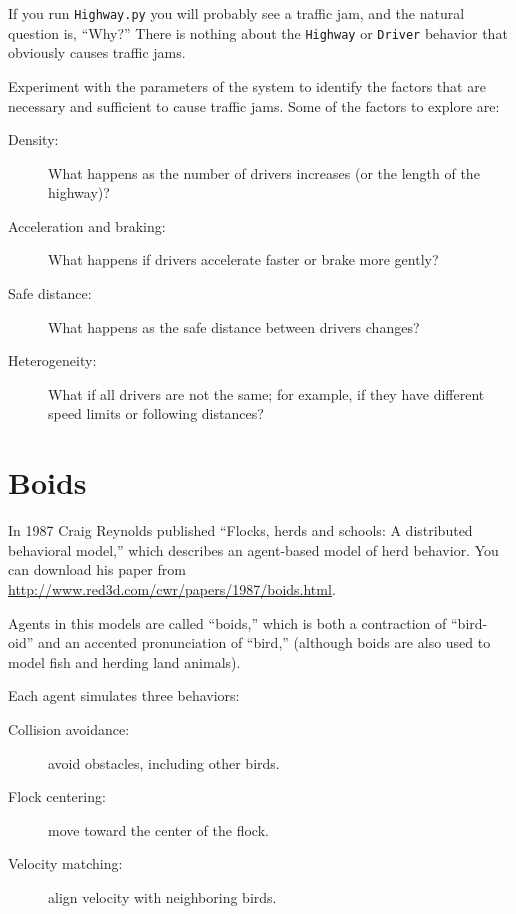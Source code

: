\documentclass[10pt]{book}
\begin{document}
If you run {\tt Highway.py} you will probably see a traffic jam,
and the natural question is, ``Why?''  There is nothing about the
{\tt Highway} or {\tt Driver} behavior that obviously causes
traffic jams.

\begin{exercise}

Experiment with the parameters of the system to identify the factors
that are necessary and sufficient to cause traffic jams.  Some of
the factors to explore are:

\begin{description}

\item[Density:] What happens as the number of drivers increases (or
the length of the highway)?

\item[Acceleration and braking:]  What happens if drivers accelerate
faster or brake more gently?

\item[Safe distance:] What happens as the safe distance between drivers
changes?

\item[Heterogeneity:] What if all drivers are not the same; for
example, if they have different speed limits or following distances?

\end{description}

\end{exercise}


\section{Boids}

In 1987 Craig Reynolds published ``Flocks, herds and
schools: A distributed behavioral model,'' which describes an
agent-based model of herd behavior.  You can download his
paper from \url{http://www.red3d.com/cwr/papers/1987/boids.html}.

Agents in this models are called ``boids,'' which is both a
contraction of ``bird-oid'' and an accented pronunciation of ``bird,''
(although boids are also used to model fish and herding land animals).

Each agent simulates three behaviors:

\begin{description}

\item[Collision avoidance:] avoid obstacles, including other birds.

\item[Flock centering:] move toward the center of the flock.

\item[Velocity matching:] align velocity with neighboring birds.

\end{description}
\end{document}

